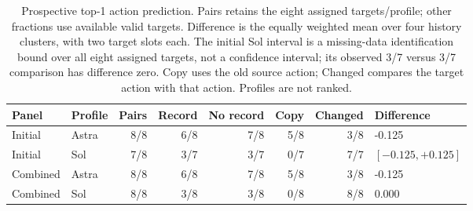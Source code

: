 \begin{table}[htbp]
\centering\small
\begin{tabular}{llrrrrrl}\toprule
Panel & Profile & Pairs & Record & No record & Copy & Changed & Difference\\\midrule
Initial & Astra & 8/8 & 6/8 & 7/8 & 5/8 & 3/8 & -0.125\\
Initial & Sol & 7/8 & 3/7 & 3/7 & 0/7 & 7/7 & $[-0.125,+0.125]$\\
Combined & Astra & 8/8 & 6/8 & 7/8 & 5/8 & 3/8 & -0.125\\
Combined & Sol & 8/8 & 3/8 & 3/8 & 0/8 & 8/8 & 0.000\\
\bottomrule\end{tabular}
\caption{Prospective top-1 action prediction. Pairs retains the eight assigned
targets/profile; other fractions use available valid targets. Difference is
the equally weighted mean over four history clusters, with two target slots
each. The initial Sol interval is a missing-data identification bound over all
eight assigned targets, not a confidence interval; its observed 3/7 versus
3/7 comparison has difference zero. Copy uses the old source action; Changed
compares the target action with that action. Profiles are not ranked.}
\label{tab:prospective}
\end{table}
